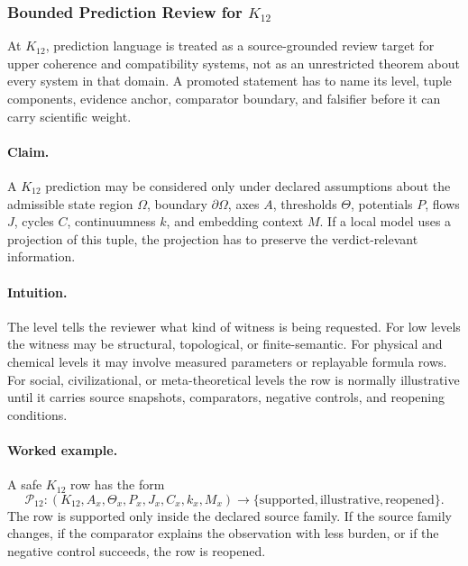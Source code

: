 \subsubsection{Bounded Prediction Review for \texorpdfstring{$K_12$}{K_12}}
\label{sec:predictions-k12-r014}

At \(K_12\), prediction language is treated as a source-grounded review
target for upper coherence and compatibility systems, not as an unrestricted theorem about every system in that
domain. A promoted statement has to name its level, tuple components, evidence
anchor, comparator boundary, and falsifier before it can carry scientific
weight.

\paragraph{Claim.}
A \(K_12\) prediction may be considered only under declared assumptions
about the admissible state region \(\Omega\), boundary \(\partial\Omega\), axes
\(A\), thresholds \(\Theta\), potentials \(P\), flows \(J\), cycles \(C\),
continuumness \(k\), and embedding context \(M\). If a local model uses a
projection of this tuple, the projection has to preserve the verdict-relevant
information.

\paragraph{Intuition.}
The level tells the reviewer what kind of witness is being requested. For low
levels the witness may be structural, topological, or finite-semantic. For
physical and chemical levels it may involve measured parameters or replayable
formula rows. For social, civilizational, or meta-theoretical levels the row is
normally illustrative until it carries source snapshots, comparators, negative
controls, and reopening conditions.

\paragraph{Worked example.}
A safe \(K_12\) row has the form
\[
  \mathcal{P}_{12}:
  (K_12, A_x, \Theta_x, P_x, J_x, C_x, k_x, M_x)
  \longrightarrow
  \{\mathrm{supported},\mathrm{illustrative},\mathrm{reopened}\}.
\]
The row is supported only inside the declared source family. If the source
family changes, if the comparator explains the observation with less burden, or
if the negative control succeeds, the row is reopened.

